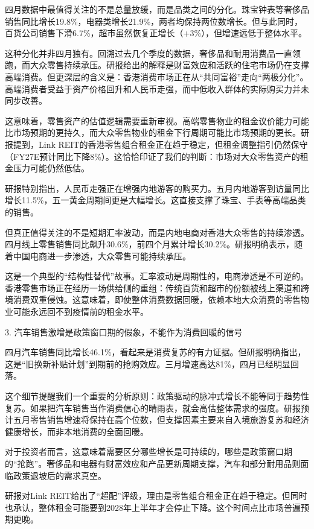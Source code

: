\documentclass[11pt]{ctexart}
\begin{document}
四月数据中最值得关注的不是总量放缓，而是品类之间的分化。珠宝钟表等奢侈品销售同比增长19.8\%，电器类增长21.9\%，两者均保持两位数增长。但与此同时，百货公司销售下滑6.7\%，超市虽然恢复正增长（+3\%），但增速远低于整体水平。

这种分化并非四月独有。回溯过去几个季度的数据，奢侈品和耐用消费品一直领跑，而大众零售持续承压。研报给出的解释是财富效应和活跃的住宅市场仍在支撑高端消费。但更深层的含义是：香港消费市场正在从“共同富裕”走向“两极分化”。高端消费者受益于资产价格回升和人民币走强，而中低收入群体的实际购买力并未同步改善。

这意味着，零售资产的估值逻辑需要重新审视。高端零售物业的租金议价能力可能比市场预期的更持久，而大众零售物业的租金下行周期可能比市场预期的更长。研报提到，Link REIT的香港零售组合租金正在趋于稳定，但租金调整指引仍然保守（FY27E预计同比下降8\%）。这恰恰印证了我们的判断：市场对大众零售资产的租金压力可能仍然低估。

研报特别指出，人民币走强正在增强内地游客的购买力。五月内地游客到访量同比增长11.5\%，五一黄金周期间更是大幅增长。这直接支撑了珠宝、手表等高端品类的销售。

但真正值得关注的不是短期汇率波动，而是内地电商对香港大众零售的持续渗透。四月线上零售销售同比飙升30.6\%，前四个月累计增长30.2\%。研报明确表示，随着中国电商进一步渗透，大众零售可能持续承压。

这是一个典型的“结构性替代”故事。汇率波动是周期性的，电商渗透是不可逆的。香港零售市场正在经历一场供给侧的重组：传统百货和超市的份额被线上渠道和跨境消费双重侵蚀。这意味着，即使整体消费数据回暖，依赖本地大众消费的零售物业可能永远回不到疫情前的租金水平。

3. 汽车销售激增是政策窗口期的假象，不能作为消费回暖的信号

四月汽车销售同比增长46.1\%，看起来是消费复苏的有力证据。但研报明确指出，这是“旧换新补贴计划”到期前的抢购效应。三月增速高达81\%，四月已经明显回落。

这个细节提醒我们一个重要的分析原则：政策驱动的脉冲式增长不能等同于趋势性复苏。如果把汽车销售当作消费信心的晴雨表，就会高估整体需求的强度。研报预计五月零售销售增速将保持在高个位数，但支撑因素主要来自入境旅游复苏和经济健康增长，而非本地消费的全面回暖。

对于投资者而言，这意味着需要区分哪些增长是可持续的，哪些是政策窗口期的“抢跑”。奢侈品和电器有财富效应和产品更新周期支撑，汽车和部分耐用品则面临政策退坡后的需求真空。

研报对Link REIT给出了“超配”评级，理由是零售组合租金正在趋于稳定。但同时也承认，整体租金可能要到2028年上半年才会停止下降。这个时间点比市场普遍预期更晚。
\end{document}
